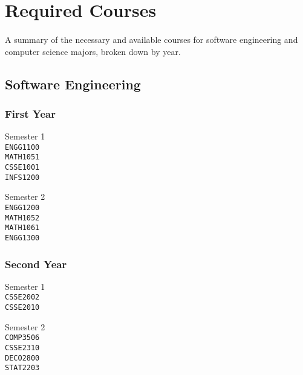 \section{Required Courses}

\paragraph{} A summary of the necessary and available courses for software engineering and computer science majors, broken down by year.

\subsection{Software Engineering}

\subsubsection{First Year}
\begin{multicols}{2}
\centering
Semester 1 \\
\texttt{ENGG1100} \\
\texttt{MATH1051} \\
\texttt{CSSE1001} \\
\texttt{INFS1200} \\
\vfill
\columnbreak

Semester 2 \\
\texttt{ENGG1200} \\
\texttt{MATH1052} \\
\texttt{MATH1061} \\
\texttt{ENGG1300} \\ 
\end{multicols}

\subsubsection{Second Year}
\begin{multicols}{2}
\centering
Semester 1 \\
\texttt{CSSE2002} \\
\texttt{CSSE2010} \\
\vfill
\columnbreak

Semester 2 \\
\texttt{COMP3506} \\
\texttt{CSSE2310} \\
\texttt{DECO2800} \\
\texttt{STAT2203} \\
\end{multicols}

